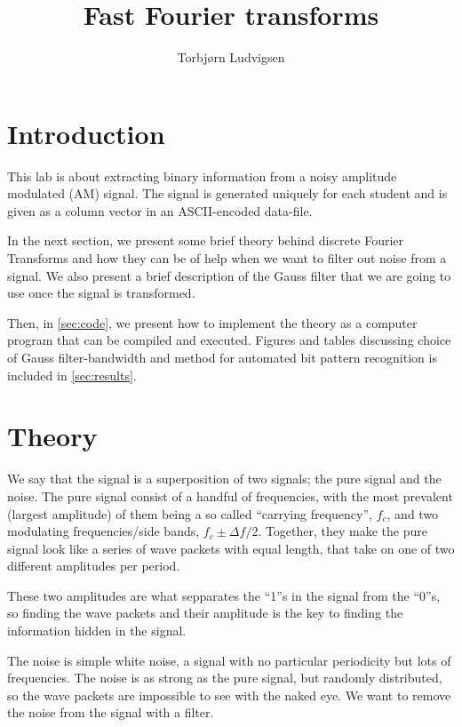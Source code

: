 \documentclass[12pt,a4paper]{article}
\author{Torbjørn Ludvigsen}
\title{Fast Fourier transforms}
\begin{document}
\maketitle
%

\begin{abstract}
\end{abstract}

\vspace{2cm}
\tableofcontents
\clearpage

\section{Introduction}
This lab is about extracting binary information from a noisy amplitude modulated (AM) signal.
The signal is generated uniquely for each student and is given as a column vector
in an ASCII-encoded data-file. 

In the next section, we present some brief theory behind discrete Fourier Transforms
and how they can be of help when we want to filter out noise from a signal.
We also present a brief description of the Gauss filter that we are going to use
once the signal is transformed.

Then, in \ref{sec:code}, we present how to implement the theory as
a computer program that can be compiled and executed.
Figures and tables discussing choice of Gauss filter-bandwidth and method for automated
bit pattern recognition is included in \ref{sec:results}.

\section{Theory}
We say that the signal is a superposition of two signals; the pure signal and the noise.
The pure signal consist of a handful of frequencies, with
the most prevalent (largest amplitude) of them being a so called ``carrying frequency'',
$f_c$, and two modulating frequencies/side bands, $f_c\pm\Delta f/2$.
Together, they make the pure signal look like
a series of wave packets with equal length, that take on one of two
different amplitudes per period.

These two amplitudes are what sepparates the ``1''s in the signal from the ``0''s,
so finding the wave packets and their amplitude is the key to finding the
information hidden in the signal.

The noise is simple white noise, a signal with no particular periodicity but lots of frequencies.
The noise is as strong as the pure signal, but randomly distributed, so the wave packets
are impossible to see with the naked eye. We want to remove the noise from the signal
with a filter.
\end{document}

